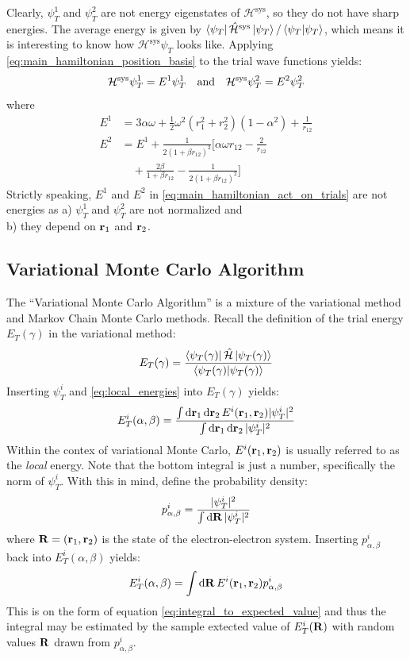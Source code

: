 \documentclass[nofootinbib,reprint,english]{revtex4-1}
\newcommand{\hatHH}{\hat{\mathcal{H}}}
\newcommand{\HH}{\mathcal{H}}
\begin{document}
Clearly, \(\psi_T^1\) and \(\psi_T^2\) are not energy eigenstates of \(\HH^\text{sys}\), so they do not have sharp energies. The average energy is given by \(\bra{\psi_T}\hatHH^\text{sys}\ket{\psi_T}/\braket{\psi_T}\), which means it is interesting to know how \(\HH^\text{sys}\psi_T\) looks like. Applying \eqref{eq:main_hamiltonian_position_basis} to the trial wave functions yields:
\begin{equation}\label{eq:main_hamiltonian_act_on_trials}
\HH^\text{sys}\psi_T^1=E^1\psi_T^1\qand\HH^\text{sys}\psi_T^2=E^2\psi_T^2
\end{equation}
where
\begin{subequations}\label{eq:local_energies}
\begin{align}
E^1&=3\alpha\omega+\frac{1}{2}\omega^2(r_1^2+r_2^2)(1-\alpha^2)+\frac{1}{r_{12}}\label{eq:wave1_local_energy}\\
E^2&=E^1+\frac{1}{2(1+\beta r_{12})^2}\bigg[\alpha\omega r_{12}-\frac{2}{r_{12}}\nonumber\\
&\quad+\frac{2\beta}{1+\beta r_{12}}-\frac{1}{2(1+\beta r_{12})^2}\bigg]\label{eq:wave2_local_energy}
\end{align}
\end{subequations}
Strictly speaking, \(E^1\) and \(E^2\) in \eqref{eq:main_hamiltonian_act_on_trials} are not energies as a) \(\psi_T^1\) and \(\psi_T^2\) are not normalized and\\
b) they depend on \(\vb{r}_1\) and \(\vb{r}_2\).
\subsection{Variational Monte Carlo Algorithm}
The ``Variational Monte Carlo Algorithm'' is a mixture of the variational method and Markov Chain Monte Carlo methods. Recall the definition of the trial energy \(E_T(\gamma)\) in the variational method:
\[E_T(\gamma)=\frac{\bra{\psi_T(\gamma)}\hatHH\ket{\psi_T(\gamma)}}{\braket{\psi_T(\gamma)}}\]
Inserting \(\psi_T^i\) and \eqref{eq:local_energies} into \(E_T(\gamma)\) yields:
\begin{equation*}
E_T^i(\alpha,\beta)=\frac{\int\dd{\vb{r}_1}\dd{\vb{r}_2}E^i(\vb{r}_1,\vb{r}_2)|\psi_T^i|^2}{\int\dd{\vb{r}_1}\dd{\vb{r}_2}|\psi_T^i|^2}
\end{equation*}
Within the contex of variational Monte Carlo, \(E^i(\vb{r}_1,\vb{r}_2)\) is usually referred to as the \emph{local} energy. Note that the bottom integral is just a number, specifically the norm of \(\psi_T^i\). With this in mind, define the probability density:
\begin{equation}
p_{\alpha,\beta}^i=\frac{|\psi_T^i|^2}{\int\dd{\vb{R}}|\psi_T^i|^2}
\end{equation}
where \(\vb{R}=(\vb{r}_1,\vb{r}_2)\) is the state of the electron-electron system. Inserting \(p_{\alpha,\beta}^i\) back into \(E_T^i(\alpha,\beta)\) yields:
\begin{equation}
E_T^i(\alpha,\beta)=\int\dd{\vb{R}}E^i(\vb{r}_1,\vb{r}_2)p_{\alpha,\beta}^i
\end{equation}
This is on the form of equation \eqref{eq:integral_to_expected_value} and thus the integral may be estimated by the sample extected value of \(E_T^i(\vb{R})\) with random values \(\vb{R}\) drawn from \(p_{\alpha,\beta}^i\).
\end{document}
